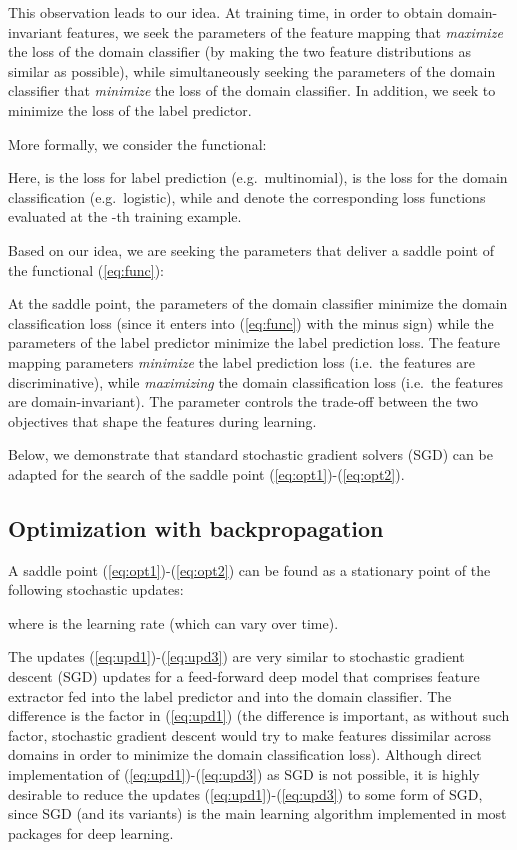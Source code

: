 \documentclass{article}
\newcommand{\eq}[1]{(\ref{eq:#1})}
\begin{document}
This observation leads to our idea. At training time, in order to obtain domain-invariant features, we seek the parameters  of the feature mapping that {\em maximize} the loss of the domain classifier (by making the two feature distributions as similar as possible), while simultaneously seeking the parameters  of the domain classifier that {\em minimize} the loss of the domain classifier. In addition, we seek to minimize the loss of the label predictor. 

More formally, we consider the functional:

Here,  is the loss for label prediction (e.g.\ multinomial),  is the loss for the domain classification (e.g.\ logistic), while  and  denote the corresponding loss functions evaluated at the -th training example. 

Based on our idea, we are seeking the parameters  that deliver a saddle point of the functional \eq{func}:



At the saddle point, the parameters  of the domain classifier  minimize the domain classification loss (since it enters into \eq{func} with the minus sign) while the parameters  of the label predictor minimize the label prediction loss. The feature mapping parameters  {\em minimize} the label prediction loss (i.e.\ the features are discriminative), while {\em maximizing} the domain classification loss (i.e.\ the features are domain-invariant). The parameter  controls the trade-off between the two objectives that shape the features during learning.

Below, we demonstrate that standard stochastic gradient solvers (SGD) can be adapted for the search of the saddle point \eq{opt1}-\eq{opt2}.

\subsection{Optimization with backpropagation}

A saddle point \eq{opt1}-\eq{opt2} can be found as a stationary point of the following stochastic updates:


where  is the learning rate (which can vary over time).

The updates \eq{upd1}-\eq{upd3} are very similar to stochastic gradient descent (SGD) updates for a feed-forward deep model that comprises feature extractor fed into the label predictor and into the domain classifier. The difference is the  factor in \eq{upd1} (the difference is important, as without such factor, stochastic gradient descent would try to make features dissimilar across domains in order to minimize the domain classification loss). Although direct implementation of \eq{upd1}-\eq{upd3} as SGD is not possible, it is highly desirable to reduce the updates \eq{upd1}-\eq{upd3} to some form of SGD, since SGD (and its variants) is the main learning algorithm implemented in most packages for deep learning. 
\end{document}
